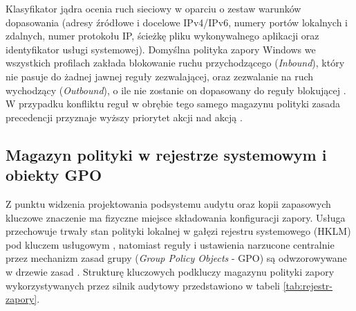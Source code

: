 Klasyfikator jądra ocenia ruch sieciowy w oparciu o zestaw warunków dopasowania (adresy źródłowe i docelowe IPv4/IPv6, numery portów lokalnych i zdalnych, numer protokołu IP, ścieżkę pliku wykonywalnego aplikacji oraz identyfikator usługi systemowej). Domyślna polityka zapory Windows we wszystkich profilach zakłada blokowanie ruchu przychodzącego (\textit{Inbound}), który nie pasuje do żadnej jawnej reguły zezwalającej, oraz zezwalanie na ruch wychodzący (\textit{Outbound}), o ile nie zostanie on dopasowany do reguły blokującej \cite{ms-defender-firewall}. W przypadku konfliktu reguł w obrębie tego samego magazynu polityki zasada precedencji przyznaje wyższy priorytet akcji  nad akcją .

\subsection{Magazyn polityki w rejestrze systemowym i obiekty GPO}\label{subsec:struktura-regul}

Z punktu widzenia projektowania podsystemu audytu oraz kopii zapasowych kluczowe znaczenie ma fizyczne miejsce składowania konfiguracji zapory. Usługa  przechowuje trwały stan polityki lokalnej w gałęzi rejestru systemowego  (HKLM) pod kluczem usługowym , natomiast reguły i ustawienia narzucone centralnie przez mechanizm zasad grupy (\textit{Group Policy Objects} - GPO) są odwzorowywane w drzewie zasad . Strukturę kluczowych podkluczy magazynu polityki zapory wykorzystywanych przez silnik audytowy przedstawiono w tabeli \ref{tab:rejestr-zapory}.


